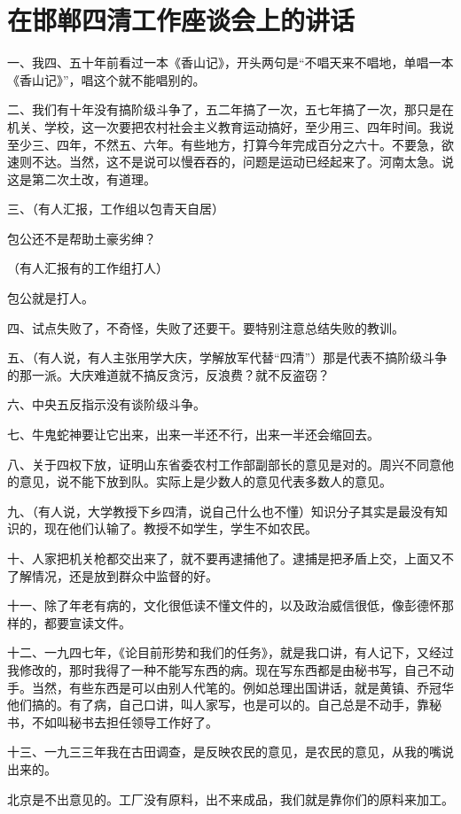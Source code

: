 \section[在邯郸四清工作座谈会上的讲话（一九六四年三月二十八日）]{在邯郸四清工作座谈会上的讲话}


一、我四、五十年前看过一本《香山记》，开头两句是“不唱天来不唱地，单唱一本《香山记》”，唱这个就不能唱别的。

二、我们有十年没有搞阶级斗争了，五二年搞了一次，五七年搞了一次，那只是在机关、学校，这一次要把农村社会主义教育运动搞好，至少用三、四年时间。我说至少三、四年，不然五、六年。有些地方，打算今年完成百分之六十。不要急，欲速则不达。当然，这不是说可以慢吞吞的，问题是运动已经起来了。河南太急。说这是第二次土改，有道理。

三、（有人汇报，工作组以包青天自居）

包公还不是帮助土豪劣绅？

（有人汇报有的工作组打人）

包公就是打人。

四、试点失败了，不奇怪，失败了还要干。要特别注意总结失败的教训。

五、（有人说，有人主张用学大庆，学解放军代替“四清”）那是代表不搞阶级斗争的那一派。大庆难道就不搞反贪污，反浪费？就不反盗窃？

六、中央五反指示没有谈阶级斗争。

七、牛鬼蛇神要让它出来，出来一半还不行，出来一半还会缩回去。

八、关于四权下放，证明山东省委农村工作部副部长的意见是对的。周兴不同意他的意见，说不能下放到队。实际上是少数人的意见代表多数人的意见。

九、（有人说，大学教授下乡四清，说自己什么也不懂）知识分子其实是最没有知识的，现在他们认输了。教授不如学生，学生不如农民。

十、人家把机关枪都交出来了，就不要再逮捕他了。逮捕是把矛盾上交，上面又不了解情况，还是放到群众中监督的好。

十一、除了年老有病的，文化很低读不懂文件的，以及政治威信很低，像彭德怀那样的，都要宣读文件。

十二、一九四七年，《论目前形势和我们的任务》，就是我口讲，有人记下，又经过我修改的，那时我得了一种不能写东西的病。现在写东西都是由秘书写，自己不动手。当然，有些东西是可以由别人代笔的。例如总理出国讲话，就是黄镇、乔冠华他们搞的。有了病，自己口讲，叫人家写，也是可以的。自己总是不动手，靠秘书，不如叫秘书去担任领导工作好了。

十三、一九三三年我在古田调查，是反映农民的意见，是农民的意见，从我的嘴说出来的。

北京是不出意见的。工厂没有原料，出不来成品，我们就是靠你们的原料来加工。


